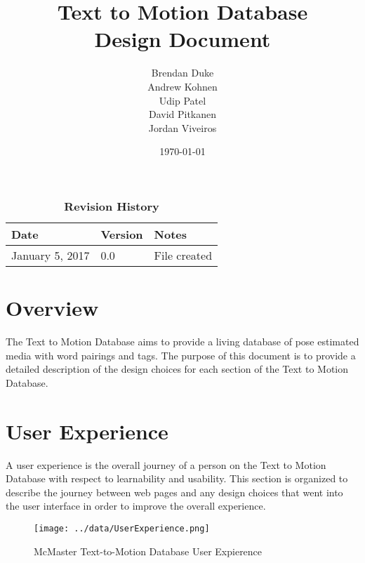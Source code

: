 \documentclass{scrreprt}
\begin{document}
\title{\bf Text to Motion Database\\[\baselineskip]\Large Design Document}
\author{Brendan Duke\\Andrew Kohnen\\Udip Patel\\David Pitkanen\\Jordan Viveiros}
\date{\today}

\maketitle

\tableofcontents


\begin{table}[bp]
\caption*{\bf Revision History}
\begin{tabularx}{\textwidth}{p{3.5cm}p{2cm}X}
\toprule {\bf Date} & {\bf Version} & {\bf Notes}\\
\midrule
January 5, 2017 & 0.0 & File created\\
\bottomrule
\end{tabularx}
\end{table}

\newpage


\chapter{Overview}
The Text to Motion Database aims to provide a living database of pose estimated media with word pairings and tags. The purpose of this document is to provide a detailed description of the design choices for each section of the Text to Motion Database.

\chapter{User Experience}
A user experience is the overall journey of a person on the Text to Motion Database with respect to learnability and usability. This section is organized to describe the journey between web pages and any design choices that went into the user interface in order to improve the overall experience.

\begin{figure}[!ht]
        \caption{McMaster Text-to-Motion Database User Expierence}
        \label{userExp}
        \centering
        \texttt{[image: ../data/UserExperience.png]}
\end{figure}
\end{document}
